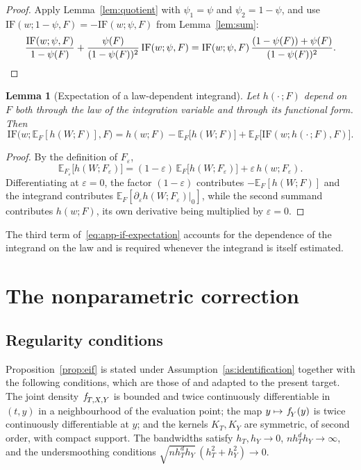\documentclass[11pt]{article}
\theoremstyle{plain}
\newtheorem{lem}{Lemma}
\theoremstyle{definition}
\theoremstyle{remark}
\newcommand{\pE}{\ensuremath{\mathbb{E}}}
\newcommand{\pf}[1]{\ensuremath{\,\mathlarger{\textit{f}}_{#1}}}
\newcommand{\IF}{\mathrm{IF}}
\begin{document}
\begin{proof}
Apply Lemma~\ref{lem:quotient} with $\psi_1 = \psi$ and $\psi_2 = 1-\psi$, and use
$\IF(w;1-\psi,F) = -\IF(w;\psi,F)$ from Lemma~\ref{lem:sum}:
\[
\frac{\IF(w;\psi,F)}{1-\psi(F)}
+ \frac{\psi(F)}{(1-\psi(F))^2}\,\IF(w;\psi,F)
= \IF(w;\psi,F)\,\frac{(1-\psi(F)) + \psi(F)}{(1-\psi(F))^2} . \qedhere
\]
\end{proof}

\begin{lem}[Expectation of a law-dependent integrand]
\label{lem:if-expectation}
Let $h(\cdot\,;F)$ depend on $F$ both through the law of the integration variable and
through its functional form. Then
\begin{equation}
\IF\big(w; \pE_F[h(W;F)], F\big)
= h(w;F) - \pE_F\big[h(W;F)\big]
+ \pE_F\big[ \IF(w;h(\cdot\,;F),F) \big].
\label{eq:app-if-expectation}
\end{equation}
\end{lem}

\begin{proof}
By the definition of $F_\varepsilon$,
\[
\pE_{F_\varepsilon}\big[h(W;F_\varepsilon)\big]
= (1-\varepsilon)\,\pE_F\big[h(W;F_\varepsilon)\big]
+ \varepsilon\,h(w;F_\varepsilon).
\]
Differentiating at $\varepsilon = 0$, the factor $(1-\varepsilon)$ contributes
$-\pE_F[h(W;F)]$ and the integrand contributes
$\pE_F[\partial_\varepsilon h(W;F_\varepsilon)|_{0}]$, while the second summand
contributes $h(w;F)$, its own derivative being multiplied by $\varepsilon = 0$.
\end{proof}

The third term of~\eqref{eq:app-if-expectation} accounts for the dependence of the
integrand on the law and is required whenever the integrand is itself estimated.

\section{The nonparametric correction}
\label{app:classical}

\subsection{Regularity conditions}
\label{app:classical-regularity}

Proposition~\ref{prop:eif} is stated under Assumption~\ref{as:identification} together
with the following conditions, which are those of \citet{kennedy2017continuous} and
\citet{kennedy2023density} adapted to the present target. The joint density
$\pf{T,X,Y}$ is bounded and twice continuously differentiable in $(t,y)$ in a
neighbourhood of the evaluation point; the map $y \mapsto \pf{Y}(y)$ is twice
continuously differentiable at $y$; and the kernels $K_T,K_Y$ are symmetric, of second
order, with compact support. The bandwidths satisfy $h_T,h_Y \to 0$,
$n h_T^{d} h_Y \to \infty$, and the undersmoothing conditions
$\sqrt{n h_T^d h_Y}\,(h_T^2 + h_Y^2) \to 0$.
\end{document}
